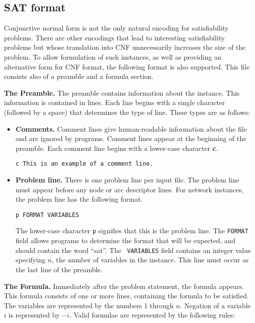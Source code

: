 \documentclass[12pt]{article}
\begin{document}
\subsection{SAT format}

Conjunctive normal form is not the only natural encoding for
satisfiability problems.  There are other encodings that lead to
interesting satisfiability problems but whose translation into CNF
unnecessarily increases the size of the problem.  To allow formulation
of such instances, as well as providing an alternative form for CNF
format, the following format is also supported.  This file consists
also of a preamble and a formula section.

{\bf The Preamble.} The preamble contains information about the
instance.  This information is contained in lines.  Each line begins
with a single character (followed by a space) that determines the type
of line.  These types are as follows:

\begin{itemize}

\item {\bf Comments.} Comment lines give human-readable 
information about the file and are ignored by programs.  Comment lines
appear at the beginning of the preamble.  Each comment line begins with a
lower-case character {\bf c}.
\begin{verbatim} 
c This is an example of a comment line.
\end{verbatim} 

\item {\bf Problem line.}  There is one problem line per input file.  The 
problem line must appear before any node or arc descriptor lines.  For
network instances, the problem line has the following format.
\begin{verbatim}
p FORMAT VARIABLES 
\end{verbatim} 

The lower-case character {\tt p} signifies that this is the problem
line.  The {\tt FORMAT} field allows programs to determine the format
that will be expected, and should contain the word ``sat''.  The {\tt
VARIABLES} field contains an integer value specifying $n$, the number
of variables in the instance.  This line must occur as the last line
of the preamble.

\end{itemize}

{\bf The Formula.}  Immediately after the problem statement, the
formula appears.  This formula consists of one or more lines,
containing the formula to be satisfied.  The variables are represented
by the numbers 1 through $n$.  Negation of a variable $i$ is represented
by $-i$.  Valid formulae are represented by the following rules:
\end{document}
